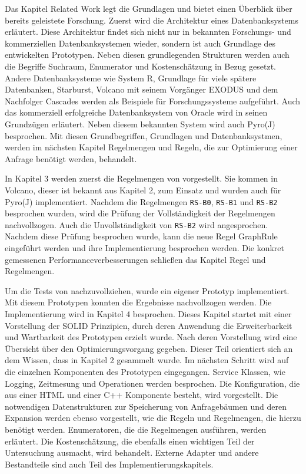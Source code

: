 Das Kapitel Related Work legt die Grundlagen und bietet einen Überblick über bereits geleistete Forschung. Zuerst wird die Architektur eines Datenbanksystems erläutert. Diese Architektur findet sich nicht nur in bekannten Forschungs- und kommerziellen Datenbanksystemen wieder, sondern ist auch Grundlage des entwickelten Prototypen. Neben diesen grundlegenden Strukturen werden auch die Begriffe Suchraum, Enumerator und Kostenschätzung in Bezug gesetzt. Andere Datenbanksysteme wie System R, Grundlage für viele spätere Datenbanken, Starburst, Volcano mit seinem Vorgänger EXODUS und dem Nachfolger Cascades werden als Beispiele für Forschungssysteme aufgeführt. Auch das kommerziell erfolgreiche Datenbanksystem von Oracle wird in seinen Grundzügen erläutert. Neben diesem bekannten System wird auch Pyro(J) \cite{roy2001multi} besprochen. Mit diesen Grundbegriffen, Grundlagen und Datenbanksystmen, werden im nächsten Kapitel Regelmengen und Regeln, die zur Optimierung einer Anfrage benötigt werden, behandelt.

In Kapitel 3 werden zuerst die Regelmengen von \cite{pellenkoft1997complexity} vorgestellt. Sie kommen in Volcano, dieser ist bekannt aus Kapitel 2, zum Einsatz und wurden auch für Pyro(J) implementiert. Nachdem die Regelmengen \texttt{RS-B0}, \texttt{RS-B1} und \texttt{RS-B2} besprochen wurden, wird die Prüfung der Vollständigkeit der Regelmengen nachvollzogen. Auch die Unvollständigkeit von \texttt{RS-B2} wird angesprochen. Nachdem diese Prüfung besprochen wurde, kann die neue Regel GraphRule eingeführt werden und ihre Implementierung besprochen werden. Die konkret gemessenen Performanceverbesserungen schließen das Kapitel Regel und Regelmengen.



Um die Tests von \cite{shanbhag2014optimizing} nachzuvollziehen, wurde ein eigener Prototyp implementiert. Mit diesem Prototypen konnten die Ergebnisse nachvollzogen werden. Die Implementierung wird in Kapitel 4 besprochen. Dieses Kapitel startet mit einer Vorstellung der SOLID Prinzipien, durch deren Anwendung die Erweiterbarkeit und Wartbarkeit des Prototypen erzielt wurde. Nach deren Vorstellung wird eine Übersicht über den Optimierungsvorgang gegeben. Dieser Teil orientiert sich an dem Wissen, dass in Kapitel 2 gesammelt wurde. Im nächsten Schritt wird auf die einzelnen Komponenten des Prototypen eingegangen. Service Klassen, wie Logging, Zeitmesung und Operationen werden besprochen. Die Konfiguration, die aus einer HTML und einer C++ Komponente besteht, wird vorgestellt. Die notwendigen Datenstrukturen zur Speicherung von Anfragebäumen und deren Expansion werden ebenso vorgestellt, wie die Regeln und Regelmengen, die hierzu benötigt werden. Enumeratoren, die die Regelmengen ausführen, werden erläutert. Die Kostenschätzung, die ebenfalls einen wichtigen Teil der Untersuchung ausmacht, wird behandelt. Externe Adapter und andere Bestandteile sind auch Teil des Implementierungskapitels.


